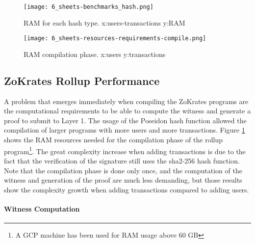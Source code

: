\begin{figure}
	\centering
	\begin{minipage}{.48\textwidth}
		\centering
		\texttt{[image: 6\_sheets-benchmarks\_hash.png]}
		\caption[RAM Usage hash]{RAM for each hash type. \newline x:users-transactions y:RAM}
		\label{fig:7_sheets-benchmarks_hash.png}
	\end{minipage}
	\begin{minipage}{.48\textwidth}
		\centering
		\texttt{[image: 6\_sheets-resources-requirements-compile.png]}
		\caption[RAM Compile]{RAM compilation phase. \newline x:users y:transactions}
		\label{fig:7_sheets-resources-requirements-compile.png}
	\end{minipage}%
\end{figure}

\subsection{ZoKrates Rollup Performance\label{subsec:6_zokratesperf}}

A problem that emerges immediately when compiling the ZoKrates programs are the computational requirements to be able to compute the witness and generate a proof to submit to Layer 1. The usage of the Poseidon hash function allowed the compilation of larger programs with more users and more transactions. Figure \ref{fig:7_sheets-resources-requirements-compile.png} shows the RAM resources needed for the compilation phase of the rollup program\footnote{A GCP machine has been used for RAM usage above 60 GB}. The great complexity increase when adding transactions is due to the fact that the verification of the signature still uses the sha2-256 hash function. Note that the compilation phase is done only once, and the computation of the witness and generation of the proof are much less demanding, but those results show the complexity growth when adding transactions compared to adding users.

\paragraph{Witness Computation}

